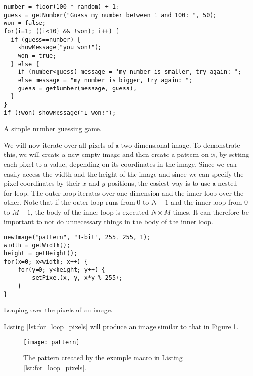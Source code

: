 \begin{listing}[H]
\begin{verbatim}
number = floor(100 * random) + 1;
guess = getNumber("Guess my number between 1 and 100: ", 50);
won = false;
for(i=1; ((i<10) && !won); i++) {
  if (guess==number) {
    showMessage("you won!");
    won = true;
  } else {
    if (number<guess) message = "my number is smaller, try again: ";
    else message = "my number is bigger, try again: "; 
    guess = getNumber(message, guess);
  }
}
if (!won) showMessage("I won!"); 
\end{verbatim}
\caption{A simple number guessing game.}
\label{lst:for_loop_game}
\end{listing}

We will now iterate over all pixels of a two-dimensional image. To demonstrate this, we will create a new empty image and then create a pattern on it, by setting each pixel to a value, depending on its coordinates in the image. Since we can easily access the width and the height of the image and since we can specify the pixel coordinates by their $x$ and $y$ positions, the easiest way is to use a nested for-loop. The outer loop iterates over one dimension and the inner-loop over the other. Note that if the outer loop runs from $0$ to $N-1$ and the inner loop from $0$ to $M-1$, the body of the inner loop is executed $N \times M$ times. It can therefore be important to not do unnecessary things in the body of the inner loop.

\begin{listing}[H]
\begin{verbatim}
newImage("pattern", "8-bit", 255, 255, 1);
width = getWidth();
height = getHeight();
for(x=0; x<width; x++) {
    for(y=0; y<height; y++) {
    	setPixel(x, y, x*y % 255);
    }
}
\end{verbatim}
\caption{Looping over the pixels of an image.}
\label{lst:for_loop_pixels}
\end{listing}

Listing \ref{lst:for_loop_pixels} will produce an image similar to that in Figure \ref{fig:pattern}.

\begin{figure}[h!]
  \centering
    \texttt{[image: pattern]}
    \caption[A pattern created by the example macro]{The pattern created by the example macro in Listing \ref{lst:for_loop_pixels}.}
    \label{fig:pattern}
\end{figure}

